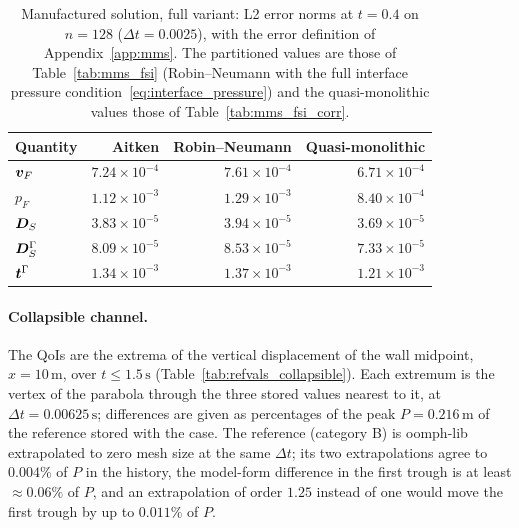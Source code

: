 \begin{table}[htbp]
	\centering
	\small
	\caption{Manufactured solution, full variant: L2 error norms at $t = 0.4$ on $n = 128$ ($\Delta t = 0.0025$), with the error definition of Appendix~\ref{app:mms}. The partitioned values are those of Table~\ref{tab:mms_fsi} (Robin--Neumann with the full interface pressure condition~\eqref{eq:interface_pressure}) and the quasi-monolithic values those of Table~\ref{tab:mms_fsi_corr}.}
	\label{tab:refvals_mms}
	\begin{tabular}{lrrr}
		\toprule
		Quantity & Aitken & Robin--Neumann & Quasi-monolithic \\
		\midrule
		$\boldsymbol{v}_F$ & $7.24\times10^{-4}$ & $7.61\times10^{-4}$ & $6.71\times10^{-4}$ \\
		$p_F$ & $1.12\times10^{-3}$ & $1.29\times10^{-3}$ & $8.40\times10^{-4}$ \\
		$\boldsymbol{D}_S$ & $3.83\times10^{-5}$ & $3.94\times10^{-5}$ & $3.69\times10^{-5}$ \\
		$\boldsymbol{D}_S^\Gamma$ & $8.09\times10^{-5}$ & $8.53\times10^{-5}$ & $7.33\times10^{-5}$ \\
		$\boldsymbol{t}^\Gamma$ & $1.34\times10^{-3}$ & $1.37\times10^{-3}$ & $1.21\times10^{-3}$ \\
		\bottomrule
	\end{tabular}
\end{table}

\paragraph{Collapsible channel.}
The QoIs are the extrema of the vertical displacement of the wall midpoint, $x = 10\,\mathrm{m}$, over $t \leq 1.5\,\mathrm{s}$ (Table~\ref{tab:refvals_collapsible}).
Each extremum is the vertex of the parabola through the three stored values nearest to it, at $\Delta t = 0.00625\,\mathrm{s}$; differences are given as percentages of the peak $P = 0.216\,\mathrm{m}$ of the reference stored with the case.
The reference (category B) is oomph-lib extrapolated to zero mesh size at the same $\Delta t$; its two extrapolations agree to $0.004\%$ of $P$ in the history, the model-form difference in the first trough is at least $\approx0.06\%$ of $P$, and an extrapolation of order $1.25$ instead of one would move the first trough by up to $0.011\%$ of $P$.

